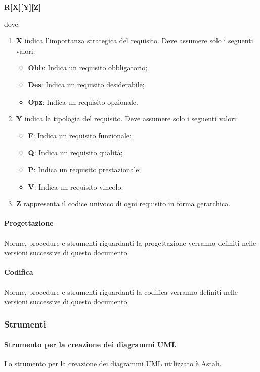 \documentclass[../NormeProgetto.tex]{subfiles}
\begin{document}
				\begin{center}\textbf{R[X][Y][Z]}\end{center} dove:
					\begin{enumerate}
						\item \textbf{X} indica l'importanza strategica del requisito. Deve assumere solo i seguenti valori:
						\begin{itemize}
							\item \textbf{Obb}: Indica un requisito obbligatorio;
							\item \textbf{Des}: Indica un requisito desiderabile;
							\item \textbf{Opz}: Indica un requisito opzionale.
						\end{itemize}
						\item \textbf{Y} indica la tipologia del requisito. Deve assumere solo i seguenti valori:
						\begin{itemize}
							\item \textbf{F}: Indica un requisito funzionale;
							\item \textbf{Q}: Indica un requisito qualità;
							\item \textbf{P}: Indica un requisito prestazionale;
							\item \textbf{V}: Indica un requisito vincolo;
						\end{itemize}
						\item \textbf{Z} rappresenta il codice univoco di ogni requisito in forma gerarchica.
					\end{enumerate}
			\paragraph{Progettazione}
			Norme, procedure e strumenti riguardanti la progettazione verranno definiti nelle versioni successive di questo documento.
			\paragraph{Codifica}
			Norme, procedure e strumenti riguardanti la codifica verranno definiti nelle versioni successive di questo documento.
		\subsubsection{Strumenti}
			\paragraph{Strumento per la creazione dei diagrammi UML}
			Lo strumento per la creazione dei diagrammi UML utilizzato è Astah.
\end{document}
